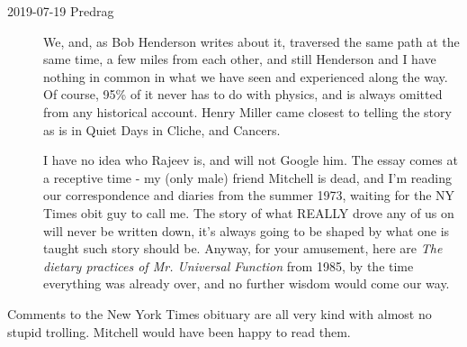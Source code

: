 \begin{description}
\item[2019-07-19 Predrag]
We, and, as
{Bob Henderson} writes about it, traversed the same path at the same
time, a few miles from each other, and still Henderson and I have nothing
in common in what we have seen and experienced along the way. Of course,
95\% of it never has to do with physics, and is always omitted from any
historical account. Henry Miller came closest to telling the story as is
in Quiet Days in Cliche, and Cancers.

I have no idea who Rajeev is, and will not Google him. The essay comes at
a receptive time - my (only male) friend Mitchell is dead, and I'm
reading our correspondence and diaries from the summer 1973, waiting for
the NY Times obit guy to call me. The story of what REALLY drove any of
us on will never be written down, it's always going to be shaped by what
one is taught such story should be. Anyway, for your amusement, here
are
{\em The dietary practices of Mr. Universal Function}
from 1985, by the time everything was already over, and no further wisdom
would come our way.

\end{description}
\bigskip

\noindent
Comments to the New York Times
{obituary} are all very kind with almost no stupid trolling. Mitchell
would have been happy to read them.

